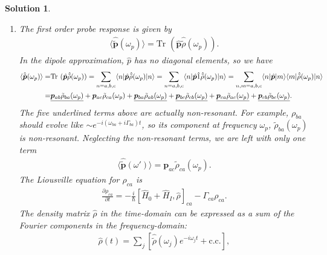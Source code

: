 \documentclass[UTF8,10pt,a4paper]{article}
\theoremstyle{Problem}
\theoremstyle{Solution}
\newtheorem*{sol}{Solution}
\newcommand{\Tr}{\text{Tr }}
\begin{document}
\begin{sol}
    \begin{enumerate}
        \item[(a)] The first order probe response is given by
        \begin{align}
            \langle\hat{\tilde{\bm{p}}}(\omega_p)\rangle=\Tr(\hat{\bm{p}}\hat{\tilde{\rho}}(\omega_p)).
        \end{align}
        In the dipole approximation, $\hat{p}$ has no diagonal elements, so we have
        \begin{align}
            \nonumber\langle\hat{\tilde{\bm{p}}}(\omega_p)\rangle=&\Tr(\hat{\bm{p}}\hat{\tilde{\rho}}(\omega_p))=\sum_{n=a,b,c}\langle n\rvert\hat{\bm{p}}\hat{\tilde{\rho}}(\omega_p)\lvert n\rangle=\sum_{n=a,b,c}\langle n\rvert\hat{\bm{p}}\hat{1}\hat{\tilde{\rho}}(\omega_p)\lvert n\rangle=\sum_{n,m=a,b,c}\langle n\rvert\hat{\bm{p}}\lvert m\rangle\langle m\rvert\hat{\tilde{\rho}}(\omega_p)\lvert n\rangle\\
            =&\uline{\bm{p}_{ab}\tilde{\rho}_{ba}(\omega_p)}+\bm{p}_{ac}\tilde{\rho}_{ca}(\omega_p)+\uline{\bm{p}_{ba}\tilde{\rho}_{ab}(\omega_p)}+\uline{\bm{p}_{bc}\tilde{\rho}_{cb}(\omega_p)}+\uline{\bm{p}_{ca}\tilde{\rho}_{ac}(\omega_p)}+\uline{\bm{p}_{cb}\tilde{\rho}_{bc}(\omega_p)}.
        \end{align}
        The five underlined terms above are actually non-resonant. For example, $\rho_{ba}$ should evolve like $\sim e^{-i(\omega_{ba}+i\Gamma_{ba})t}$, so its component at frequency $\omega_p$, $\tilde{\rho}_{ba}(\omega_p)$ is non-resonant. Neglecting the non-resonant terms, we are left with only one term
        \begin{align}
            \langle\hat{\tilde{\bm{p}}}(\omega')\rangle=\bm{p}_{ac}\tilde{\rho}_{ca}(\omega_p).
        \end{align}
        The Liousville equation for $\rho_{ca}$ is
        \begin{align}
            \label{LE}
            \frac{\partial\rho_{ca}}{\partial t}=-\frac{i}{\hbar}[\hat{H}_0+\hat{H}_I,\hat{\rho}]_{ca}-\Gamma_{ca}\rho_{ca}.
        \end{align}
        The density matrix $\hat{\rho}$ in the time-domain can be expressed as a sum of the Fourier components in the frequency-domain:
        \begin{align}
            \label{FT}
            \hat{\rho}(t)=\sum_j\left[\hat{\tilde{\rho}}(\omega_j)e^{-i\omega_jt}+\text{c.c.}\right],
        \end{align}

\end{enumerate}
\end{sol}
\end{document}
